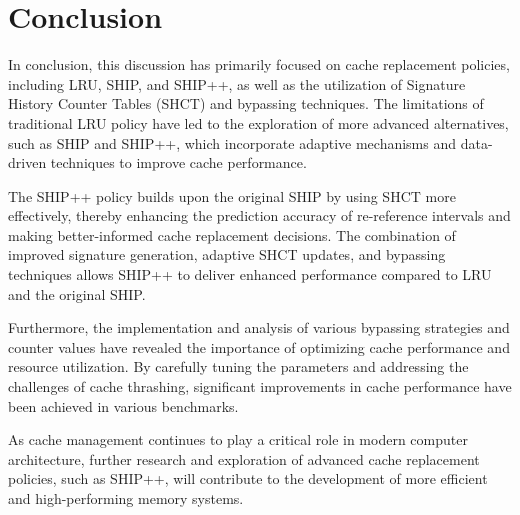 
\section{Conclusion}
In conclusion, this discussion has primarily focused on cache replacement policies, including LRU, SHIP, and SHIP++, as well as the utilization of Signature History Counter Tables (SHCT) and bypassing techniques. The limitations of traditional LRU policy have led to the exploration of more advanced alternatives, such as SHIP and SHIP++, which incorporate adaptive mechanisms and data-driven techniques to improve cache performance.

The SHIP++ policy builds upon the original SHIP by using SHCT more effectively, thereby enhancing the prediction accuracy of re-reference intervals and making better-informed cache replacement decisions. The combination of improved signature generation, adaptive SHCT updates, and bypassing techniques allows SHIP++ to deliver enhanced performance compared to LRU and the original SHIP.

Furthermore, the implementation and analysis of various bypassing strategies and counter values have revealed the importance of optimizing cache performance and resource utilization. By carefully tuning the parameters and addressing the challenges of cache thrashing, significant improvements in cache performance have been achieved in various benchmarks.

As cache management continues to play a critical role in modern computer architecture, further research and exploration of advanced cache replacement policies, such as SHIP++, will contribute to the development of more efficient and high-performing memory systems.